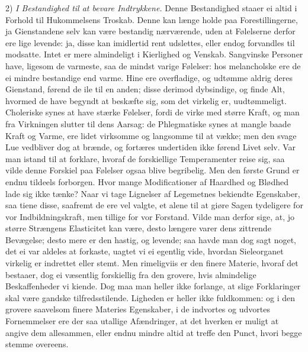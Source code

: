 \documentclass[12pt,a4paper]{article}
\newcommand{\opage}[1]{\marginnote{\footnotesize\textit{[#1]}}}
\begin{document}
2) \emph{I Bestandighed til at bevare Indtrykkene.} Denne Bestandighed staaer ei altid i
Forhold til Hukommelsens Troskab. Denne kan længe holde paa Forestillingerne, ja
Gienstandene selv kan være bestandig nærværende, uden at Følelserne derfor ere
\opage{223} lige levende: ja, disse kan imidlertid rent udslettes, eller endog forvandles til
modsatte. Intet er mere almindeligt i Kierlighed og Venskab. Sangvinske Personer have,
ligesom de varmeste, saa de mindst varige Følelser: hos melancholske ere de ei mindre
bestandige end varme. Hine ere overfladige, og udtømme aldrig deres Gienstand, førend de
ile til en anden; disse derimod dybsindige, og finde Alt, hvormed de have begyndt at
beskæfte sig, som det virkelig er, uudtømmeligt. Choleriske synes at have stærke Følelser,
fordi de virke med større Kraft, og man fra Virkningen slutter til dens Aarsag: de
Phlegmatiske synes at mangle baade Kraft og Varme, ere lidet virksomme og langsomme til at
vække; men den svage Lue vedbliver dog at brænde, og fortæres undertiden ikke førend Livet
selv. Var man istand til at forklare, hvoraf de forskiellige Temperamenter reise sig, saa
vilde denne Forskiel paa Følelser ogsaa blive begribelig. Men den første Grund er endnu
tildeels forborgen. Hvor mange Modificationer af Haardhed og Blødhed lade sig ikke tænke?
Naar vi tage Lignelser af Legemetnes bekiendte Egenskaber, saa tiene disse, saafremt de
ere vel valgte, et alene til at giøre Sagen tydeligere for vor Indbildningskraft, men
tillige for vor Forstand. Vilde man derfor sige, at, jo større Strængens Elasticitet kan
være, desto længere varer dens zittrende Bevægelse; desto mere er den hastig, og levende;
saa havde man dog sagt noget, det ei var aldeles
\opage{224} at forkaste, uagtet vi ei egentlig vide, hvordan Sieleorganet virkelig er indrettet eller
stemt. Men rimeligviis er den finere Materie, hvoraf det bestaaer, dog ei væsentlig
forskiellig fra den grovere, hvis almindelige Beskaffenheder vi kiende. Dog maa man heller
ikke forlange, at slige Forklaringer skal være gandske tilfredsstilende. Ligheden er heller
ikke fuldkommen: og i den grovere saavelsom finere Materies Egenskaber, i de indvortes og
udvortes Fornemmelser ere der saa utallige Afændringer, at det hverken er muligt at angive
dem allesammen, eller endnu mindre altid at treffe den Punct, hvori begge stemme overeens.
\end{document}
